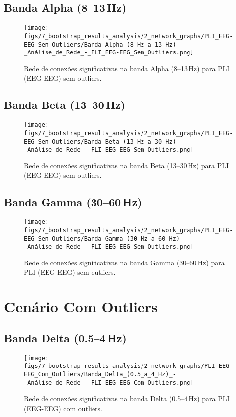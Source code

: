 \begin{apendicesenv}
    \subsection{Banda Alpha (8--13\,Hz)}
    \begin{figure}[H]
      \centering
      \texttt{[image: figs/7\_bootstrap\_results\_analysis/2\_network\_graphs/PLI\_EEG-EEG\_Sem\_Outliers/Banda\_Alpha\_(8\_Hz\_a\_13\_Hz)\_-\_Análise\_de\_Rede\_-\_PLI\_EEG-EEG\_Sem\_Outliers.png]}
      \caption{Rede de conexões significativas na banda Alpha (8--13\,Hz) para PLI (EEG-EEG) sem outliers.}
      \label{fig:apend_pli_alpha_sem}
    \end{figure}
    
    \subsection{Banda Beta (13--30\,Hz)}
    \begin{figure}[H]
      \centering
      \texttt{[image: figs/7\_bootstrap\_results\_analysis/2\_network\_graphs/PLI\_EEG-EEG\_Sem\_Outliers/Banda\_Beta\_(13\_Hz\_a\_30\_Hz)\_-\_Análise\_de\_Rede\_-\_PLI\_EEG-EEG\_Sem\_Outliers.png]}
      \caption{Rede de conexões significativas na banda Beta (13--30\,Hz) para PLI (EEG-EEG) sem outliers.}
      \label{fig:apend_pli_beta_sem}
    \end{figure}
    
    \subsection{Banda Gamma (30--60\,Hz)}
    \begin{figure}[H]
      \centering
      \texttt{[image: figs/7\_bootstrap\_results\_analysis/2\_network\_graphs/PLI\_EEG-EEG\_Sem\_Outliers/Banda\_Gamma\_(30\_Hz\_a\_60\_Hz)\_-\_Análise\_de\_Rede\_-\_PLI\_EEG-EEG\_Sem\_Outliers.png]}
      \caption{Rede de conexões significativas na banda Gamma (30--60\,Hz) para PLI (EEG-EEG) sem outliers.}
      \label{fig:apend_pli_gamma_sem}
    \end{figure}
    
    \section{Cenário Com Outliers}
    
    \subsection{Banda Delta (0.5--4\,Hz)}
    \begin{figure}[H]
      \centering
      \texttt{[image: figs/7\_bootstrap\_results\_analysis/2\_network\_graphs/PLI\_EEG-EEG\_Com\_Outliers/Banda\_Delta\_(0.5\_a\_4\_Hz)\_-\_Análise\_de\_Rede\_-\_PLI\_EEG-EEG\_Com\_Outliers.png]}
      \caption{Rede de conexões significativas na banda Delta (0.5--4\,Hz) para PLI (EEG-EEG) com outliers.}
      \label{fig:apend_pli_delta_com}
    \end{figure}
    

\end{apendicesenv}
